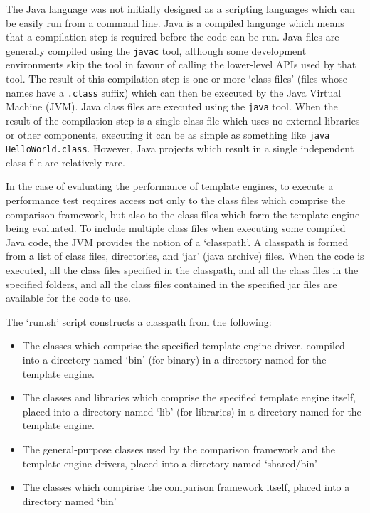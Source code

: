 The Java language was not initially designed as a scripting languages which can be easily run from a command line. Java is a compiled language which means that a compilation step is required before the code can be run. Java files are generally compiled using the \verb!javac! tool, although some development environments skip the tool in favour of calling the lower-level APIs used by that tool. The result of this compilation step is one or more `class files' (files whose names have a \verb!.class! suffix) which can then be executed by the Java Virtual Machine (JVM). Java class files are executed using the \verb!java! tool. When the result of the compilation step is a single class file which uses no external libraries or other components, executing it can be as simple as something like \verb!java HelloWorld.class!. However, Java projects which result in a single independent class file are relatively rare.

In the case of evaluating the performance of template engines, to execute a performance test requires access not only to the class files which comprise the comparison framework, but also to the class files which form the template engine being evaluated. To include multiple class files when executing some compiled Java code, the JVM provides the notion of a `classpath'. A classpath is formed from a list of class files, directories, and `jar' (java archive) files. When the code is executed, all the class files specified in the classpath, and all the class files in the specified folders, and all the class files contained in the specified jar files are available for the code to use.

The `run.sh' script constructs a classpath from the following:

\begin{itemize}
    \item The classes which comprise the specified template engine driver, compiled into a directory named `bin' (for binary) in a directory named for the template engine.
    \item The classes and libraries which comprise the specified template engine itself, placed into a directory named `lib' (for libraries) in a directory named for the template engine.
    \item The general-purpose classes used by the comparison framework and the template engine drivers, placed into a directory named `shared/bin'
    \item The classes which compirise the comparison framework itself, placed into a directory named `bin'
\end{itemize}

